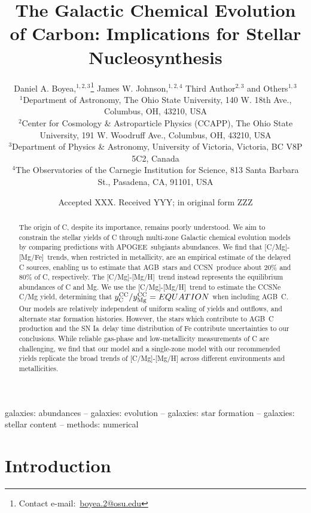 \documentclass[fleqn,
usenatbib]{mnras}
\title[The Origin and Galactic Evolution of Carbon]{The Galactic Chemical Evolution of Carbon: Implications for Stellar Nucleosynthesis }
\author[D. A. Boyea et. al.]{%
Daniel A. Boyea,$^{1, 2, 3}$\thanks{%
Contact e-mail:~\href{mailto:boyea.2@osu.edu}{boyea.2@osu.edu}}
James W. Johnson,$^{1, 2, 4}$
Third Author$^{2,3}$
and Others$^{1,3}$
\\
$^{1}$Department of Astronomy, The Ohio State University, 140 W. 18th Ave., Columbus, OH, 43210, USA
\\
$^{2}$Center for Cosmology \& Astroparticle Physics (CCAPP), The Ohio State University, 191 W. Woodruff Ave., Columbus, OH, 43210, USA
\\
$^{3}$Department of Physics \& Astronomy, University of Victoria, Victoria, BC V8P 5C2, Canada
\\
$^{4}$The Observatories of the Carnegie Institution for Science, 813 Santa Barbara St., Pasadena, CA, 91101, USA
}
\date{Accepted XXX. Received YYY; in original form ZZZ}
\newcommand{\agb}{AGB}
\newcommand{\apogee}{APOGEE}
\newcommand{\cc}{CCSN}
\newcommand{\ia}{SN Ia}
\newcommand{\caah}{[C/Mg]-[Mg/H]}
\newcommand{\caafe}{[C/Mg]-[Mg/Fe]}
\newcommand{\Ycc}{{y_{\rm C}^{\rm CC}}}
\newcommand{\Yoc}{{y_{\rm Mg}^{\rm CC}}}
\begin{document}
\label{firstpage}
\pagerange{\pageref{firstpage}--\pageref{lastpage}}
\maketitle



\begin{abstract}
The origin of C, despite its importance, remains poorly understood. 
% 
We aim to constrain the stellar yields of C through multi-zone Galactic chemical evolution models by comparing predictions with \apogee\ subgiants abundances.
% 
We find that \caafe\ trends, when restricted in metallicity, are an empirical estimate of the delayed C sources, enabling us to estimate that \agb\ stars and \cc\ produce about 20\% and 80\% of C, respectively.  
The \caah\ trend instead represents the equilibrium abundances of C and Mg. 
We use the \caah\ trend to estimate the CCSNe C/Mg yield, determining that  $\Ycc/\Yoc = EQUATION$ when including \agb\ C. 
Our models are relatively independent of uniform scaling of yields and outflows, and alternate star formation histories. 
However, the stars which contribute to \agb\ C production and the \ia\ delay time distribution of Fe contribute uncertainties to our conclusions. 
While reliable gas-phase and low-metallicity measurements of C are challenging, we find that our model and a single-zone model with our recommended yields replicate the broad trends of \caah{} across different environments and metallicities. 

\end{abstract}

\begin{keywords}
galaxies: abundances -- galaxies: evolution -- galaxies: star formation -- galaxies: stellar content -- methods: numerical
\end{keywords}





\section{Introduction}
\end{document}
